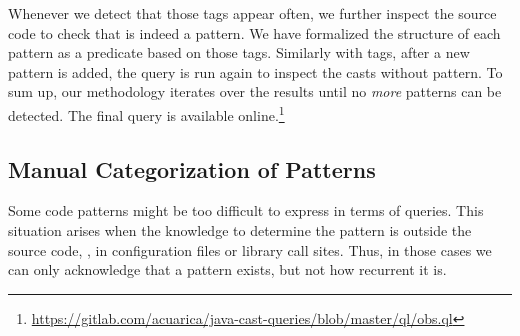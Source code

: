 Whenever we detect that those tags appear often,
we further inspect the source code to check that is indeed a pattern.
We have formalized the structure of each pattern as a \ql{} predicate based on those tags.
Similarly with tags, after a new pattern is added, the query is run again to inspect the casts without pattern.
To sum up, our methodology iterates over the results until no \emph{more} patterns can be detected.
The final \ql{} query is available online.\footnote{\url{https://gitlab.com/acuarica/java-cast-queries/blob/master/ql/obs.ql}}


\subsection*{Manual Categorization of Patterns}

Some code patterns might be too difficult to express in terms of \ql{} queries.
This situation arises when the knowledge to determine the pattern is outside the source code,
\eg, in configuration files or library call sites.
Thus, in those cases we can only acknowledge that a pattern exists, but not how recurrent it is.

% 
